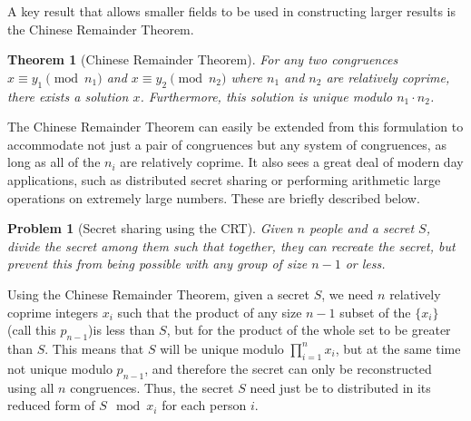 \documentclass[pageno]{jpaper}
\newtheorem{theorem}{Theorem}[section]
\newtheorem{problem}{Problem}[section]
\begin{document}
A key result that allows smaller fields to be used in constructing larger results is the Chinese Remainder Theorem.
\begin{theorem}[Chinese Remainder Theorem]
  For any two congruences $x\equiv y_1\pmod n_1$ and $x\equiv y_2\pmod n_2$ where $n_1$ and $n_2$ are relatively coprime, there exists a solution $x$.
  Furthermore, this solution is unique modulo $n_1\cdot n_2$.
\end{theorem}
The Chinese Remainder Theorem can easily be extended from this formulation to accommodate not just a pair of congruences but any system of congruences, as long as all of the $n_i$ are relatively coprime.
It also sees a great deal of modern day applications, such as distributed secret sharing or performing arithmetic large operations on extremely large numbers.
These are briefly described below.

\begin{problem}[Secret sharing using the CRT]
  Given $n$ people and a secret $S$, divide the secret among them such that together, they can recreate the secret, but prevent this from being possible with any group of size $n-1$ or less.
\end{problem}
Using the Chinese Remainder Theorem, given a secret $S$, we need $n$ relatively coprime integers $x_i$ such that the product of any size $n-1$ subset of the $\{x_i\}$ (call this $p_{n-1}$)is less than $S$, but for the product of the whole set to be greater than $S$.
This means that $S$ will be unique modulo $\prod_{i=1}^n x_i$, but at the same time not unique modulo $p_{n-1}$, and therefore the secret can only be reconstructed using all $n$ congruences.
Thus, the secret $S$ need just be to distributed in its reduced form of $S\mod x_i$ for each person $i$.
\end{document}
